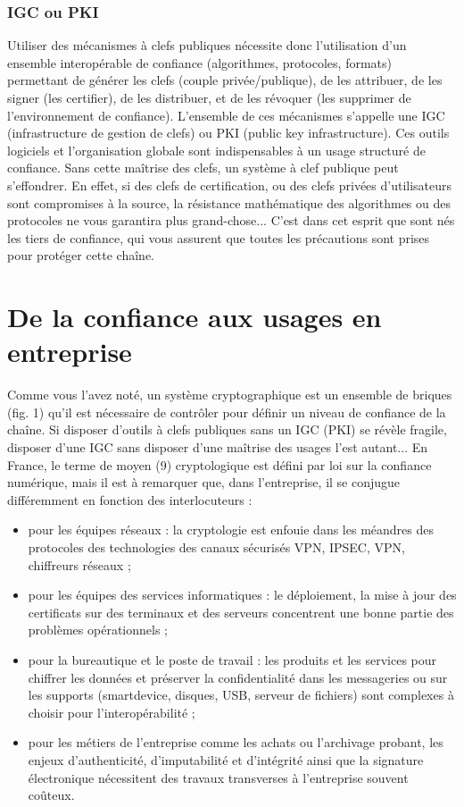 \subsubsection{IGC ou PKI}

Utiliser des mécanismes à clefs publiques nécessite donc l'utilisation d'un ensemble interopérable de confiance (algorithmes, protocoles, formats) permettant de générer les clefs (couple privée/publique), de les attribuer, de les signer (les certifier), de les distribuer, et de les révoquer (les supprimer de l'environnement de confiance). L'ensemble de ces mécanismes s'appelle une IGC (infrastructure de gestion de clefs) ou PKI (public key infrastructure). Ces outils logiciels et l'organisation globale sont indispensables à un usage structuré de confiance. Sans cette maîtrise des clefs, un système à clef publique peut s'effondrer. En effet, si des clefs de certification, ou des clefs privées d'utilisateurs sont compromises à la source, la résistance mathématique des algorithmes ou des protocoles ne vous garantira plus grand-chose... C'est dans cet esprit que sont nés les tiers de confiance, qui vous assurent que toutes les précautions sont prises pour protéger cette chaîne.



\section{De la confiance aux usages en entreprise}
Comme vous l'avez noté, un système cryptographique est un ensemble de briques (fig. 1) qu'il est nécessaire de contrôler pour définir un niveau de confiance de la chaîne. Si disposer d'outils à clefs publiques sans un IGC (PKI) se révèle fragile, disposer d'une IGC sans disposer d'une maîtrise des usages l'est autant...
En France, le terme de moyen (9) cryptologique est défini par loi sur la confiance numérique, mais il est à remarquer que, dans l'entreprise, il se conjugue différemment en fonction des interlocuteurs :


\begin{itemize}
 \item pour les équipes réseaux : la cryptologie est enfouie dans les méandres des protocoles des technologies des canaux sécurisés VPN, IPSEC, VPN, chiffreurs réseaux ;
 \item pour les équipes des services informatiques : le déploiement, la mise à jour des certificats sur des terminaux et des serveurs concentrent une bonne partie des problèmes opérationnels ;
 \item pour la bureautique et le poste de travail : les produits et les services pour chiffrer les données et préserver la confidentialité dans les messageries ou sur les supports (smartdevice, disques, USB, serveur de fichiers) sont complexes à choisir pour l'interopérabilité ;
 \item pour les métiers de l'entreprise comme les achats ou l'archivage probant, les enjeux d'authenticité, d'imputabilité et d'intégrité ainsi que la signature électronique nécessitent des travaux transverses à l'entreprise souvent coûteux.
\end{itemize}

